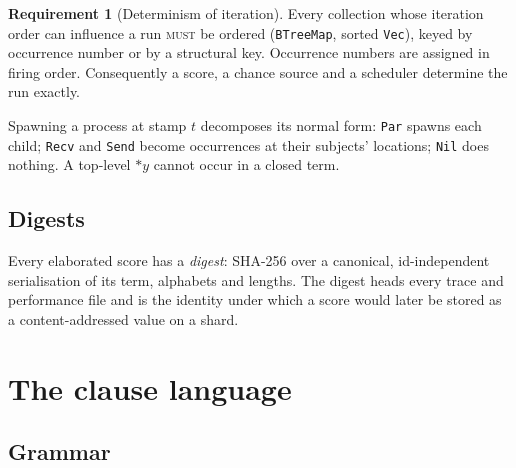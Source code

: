 \documentclass[11pt,a4paper]{article}
\theoremstyle{definition}
\newtheorem{requirement}{Requirement}[section]
\theoremstyle{remark}
\newcommand{\MUST}{\textsc{must}}
\begin{document}
\begin{requirement}[Determinism of iteration]\label{req:btree}
Every collection whose iteration order can influence a run \MUST{} be ordered
(\texttt{BTreeMap}, sorted \texttt{Vec}), keyed by occurrence number or by a
structural key. Occurrence numbers are assigned in firing order. Consequently a
score, a chance source and a scheduler determine the run exactly.
\end{requirement}

Spawning a process at stamp $t$ decomposes its normal form: \texttt{Par} spawns
each child; \texttt{Recv} and \texttt{Send} become occurrences at their
subjects' locations; \texttt{Nil} does nothing. A top-level $\ast y$ cannot occur
in a closed term.

\subsection{Digests}\label{ssec:digest}

Every elaborated score has a \emph{digest}: SHA-256 over a canonical,
id-independent serialisation of its term, alphabets and lengths. The digest
heads every trace and performance file and is the identity under which a score
would later be stored as a content-addressed value on a shard.

\section{The clause language}\label{sec:clauses}

\subsection{Grammar}
\end{document}
